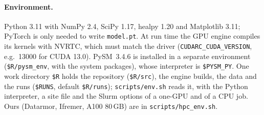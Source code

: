\documentclass{aa}
\begin{document}
\begin{appendix}
\paragraph{Environment.} Python 3.11 with NumPy 2.4, SciPy 1.17, healpy 1.20 and Matplotlib 3.11; PyTorch is only needed to write \texttt{model.pt}. At run time the GPU engine compiles its kernels with NVRTC, which must match the driver (\texttt{CUDARC\_CUDA\_VERSION}, e.g.\ 13000 for CUDA 13.0). PySM~3.4.6 is installed in a separate environment (\texttt{\$R/pysm\_env}, with the system packages), whose interpreter is \texttt{\$PYSM\_PY}. One work directory \texttt{\$R} holds the repository (\texttt{\$R/src}), the engine builds, the data and the runs (\texttt{\$RUNS}, default \texttt{\$R/runs}); \texttt{scripts/env.sh} reads it, with the Python interpreter, a site file and the Slurm options of a one-GPU and of a CPU job. Ours (Datarmor, Ifremer, A100 80\,GB) are in \texttt{scripts/hpc\_env.sh}.


\end{appendix}
\end{document}
